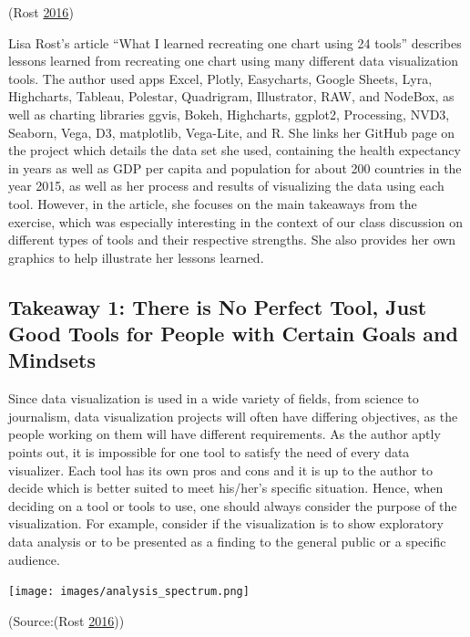 \documentclass[]{book}
\begin{document}
(Rost \protect\hyperlink{ref-different_tools}{2016})

Lisa Rost's article ``What I learned recreating one chart using 24 tools'' describes lessons learned from recreating one chart using many different data visualization tools. The author used apps Excel, Plotly, Easycharts, Google Sheets, Lyra, Highcharts, Tableau, Polestar, Quadrigram, Illustrator, RAW, and NodeBox, as well as charting libraries ggvis, Bokeh, Highcharts, ggplot2, Processing, NVD3, Seaborn, Vega, D3, matplotlib, Vega-Lite, and R. She links her GitHub page on the project which details the data set she used, containing the health expectancy in years as well as GDP per capita and population for about 200 countries in the year 2015, as well as her process and results of visualizing the data using each tool. However, in the article, she focuses on the main takeaways from the exercise, which was especially interesting in the context of our class discussion on different types of tools and their respective strengths. She also provides her own graphics to help illustrate her lessons learned.

\hypertarget{takeaway-1-there-is-no-perfect-tool-just-good-tools-for-people-with-certain-goals-and-mindsets}{%
\subsection{Takeaway 1: There is No Perfect Tool, Just Good Tools for People with Certain Goals and Mindsets}\label{takeaway-1-there-is-no-perfect-tool-just-good-tools-for-people-with-certain-goals-and-mindsets}}

Since data visualization is used in a wide variety of fields, from science to journalism, data visualization projects will often have differing objectives, as the people working on them will have different requirements. As the author aptly points out, it is impossible for one tool to satisfy the need of every data visualizer. Each tool has its own pros and cons and it is up to the author to decide which is better suited to meet his/her's specific situation. Hence, when deciding on a tool or tools to use, one should always consider the purpose of the visualization. For example, consider if the visualization is to show exploratory data analysis or to be presented as a finding to the general public or a specific audience.

\texttt{[image: images/analysis\_spectrum.png]}

(Source:(Rost \protect\hyperlink{ref-different_tools}{2016}))
\end{document}
